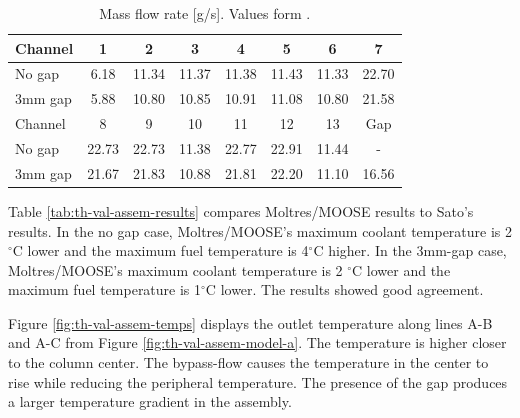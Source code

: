 
\begin{table}[htbp!]
\centering
  \caption{Mass flow rate [g/s]. Values form \cite{sato_computational_2010}.}
  \label{tab:th-val-assem-massflow}
  \begin{tabular}{l|ccccccc}
\toprule
Channel & 1 & 2 & 3 & 4 & 5 & 6 & 7 \\
\midrule
No gap  & 6.18 & 11.34 & 11.37 & 11.38 & 11.43 & 11.33 & 22.70 \\
3mm gap & 5.88 & 10.80 & 10.85 & 10.91 & 11.08 & 10.80 & 21.58 \\
\midrule
Channel & 8 & 9 & 10 & 11 & 12 & 13 & Gap \\
\midrule
No gap  & 22.73 & 22.73 & 11.38 & 22.77 & 22.91 & 11.44 & -     \\
3mm gap & 21.67 & 21.83 & 10.88 & 21.81 & 22.20 & 11.10 & 16.56 \\
\bottomrule
\end{tabular}
\end{table}

Table \ref{tab:th-val-assem-results} compares Moltres/MOOSE results to Sato's results.
In the no gap case, Moltres/MOOSE's maximum coolant temperature is 2 $^{\circ}$C lower and the maximum fuel temperature is 4$^{\circ}$C higher.
In the 3mm-gap case, Moltres/MOOSE's maximum coolant temperature is 2 $^{\circ}$C lower and the maximum fuel temperature is 1$^{\circ}$C lower.
The results showed good agreement.

Figure \ref{fig:th-val-assem-temps} displays the outlet temperature along lines A-B and A-C from Figure \ref{fig:th-val-assem-model-a}.
The temperature is higher closer to the column center.
The bypass-flow causes the temperature in the center to rise while reducing the peripheral temperature.
The presence of the gap produces a larger temperature gradient in the assembly.

